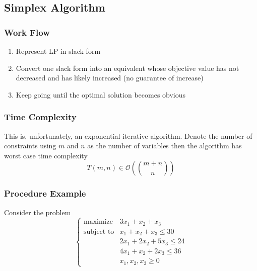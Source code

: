 \documentclass[10pt]{article}
\begin{document}
\subsection{Simplex Algorithm}

\subsubsection{Work Flow}
\begin{enumerate}
    \item Represent LP in slack form
    \item Convert one slack form into an equivalent whose objective value has not decreased and has likely increased (no guarantee of increase)
    \item Keep going until the optimal solution becomes obvious
\end{enumerate}

\subsubsection{Time Complexity} This is, unfortunately, an exponential iterative algorithm. Denote the number of constraints using $m$ and $n$ as the number of variables then the algorithm has worst case time complexity 
\begin{equation*}
    T(m,n) \in \mathcal{O}\left(\binom{m+n}{n}\right)
\end{equation*}

\subsubsection{Procedure Example}
Consider the problem
$$
\begin{cases}
    \text{maximize} & 3x_1 + x_2 + x_3 \\
    \text{subject to} &x_1 + x_2 + x_3 \leq 30 \\
    &2x_1 + 2x_2 + 5x_3 \leq 24 \\
    &4x_1 + x_2 + 2x_3 \leq 36 \\
    &x_1,x_2,x_3\geq 0
\end{cases}
$$
\end{document}
